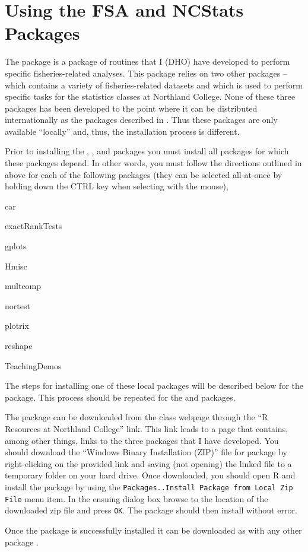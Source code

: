 \documentclass[a4paper]{article}
\begin{document}
\section{Using the FSA and NCStats Packages} \label{sect:NCStats}
The  package is a package of routines that I (DHO) have developed to perform specific fisheries-related analyses. This package relies on two other packages --  which contains a variety of fisheries-related datasets and  which is used to perform specific tasks for the statistics classes at Northland College.  None of these three packages has been developed to the point where it can be distributed internationally as the packages described in .  Thus these packages are only available ``locally'' and, thus, the installation process is different.

Prior to installing the , , and  packages you must install all packages for which these packages depend.  In other words, you must follow the directions outlined in  above for each of the following packages (they can be selected all-at-once by holding down the CTRL key when selecting with the mouse),
\begin{Enumerate}
  \item car
  \item exactRankTests
  \item gplots
  \item Hmisc
  \item multcomp
  \item nortest
  \item plotrix
  \item reshape
  \item TeachingDemos
\end{Enumerate}

The steps for installing one of these local packages will be described below for the  package.  This process should be repeated for the  and  packages.

The  package can be downloaded from the class webpage through the ``R Resources at Northland College'' link.  This link leads to a page that contains, among other things, links to the three packages that I have developed.  You should download the ``Windows Binary Installation (ZIP)'' file for  package by right-clicking on the provided link and saving (not opening) the linked file to a temporary folder on your hard drive.  Once downloaded, you should open R and install the  package by using the \verb"Packages..Install Package from Local Zip File" menu item.  In the ensuing dialog box browse to the location of the downloaded zip file and press \verb"OK".  The  package should then install without error.

Once the  package is successfully installed it can be downloaded as with any other package .
\end{document}

